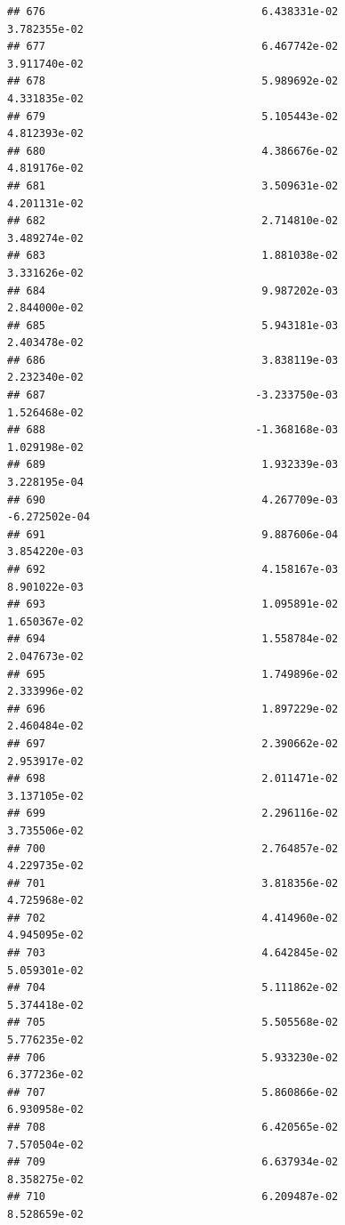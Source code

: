 \documentclass[
]{article}
\begin{document}
\begin{verbatim}
## 676                                  6.438331e-02           3.782355e-02
## 677                                  6.467742e-02           3.911740e-02
## 678                                  5.989692e-02           4.331835e-02
## 679                                  5.105443e-02           4.812393e-02
## 680                                  4.386676e-02           4.819176e-02
## 681                                  3.509631e-02           4.201131e-02
## 682                                  2.714810e-02           3.489274e-02
## 683                                  1.881038e-02           3.331626e-02
## 684                                  9.987202e-03           2.844000e-02
## 685                                  5.943181e-03           2.403478e-02
## 686                                  3.838119e-03           2.232340e-02
## 687                                 -3.233750e-03           1.526468e-02
## 688                                 -1.368168e-03           1.029198e-02
## 689                                  1.932339e-03           3.228195e-04
## 690                                  4.267709e-03          -6.272502e-04
## 691                                  9.887606e-04           3.854220e-03
## 692                                  4.158167e-03           8.901022e-03
## 693                                  1.095891e-02           1.650367e-02
## 694                                  1.558784e-02           2.047673e-02
## 695                                  1.749896e-02           2.333996e-02
## 696                                  1.897229e-02           2.460484e-02
## 697                                  2.390662e-02           2.953917e-02
## 698                                  2.011471e-02           3.137105e-02
## 699                                  2.296116e-02           3.735506e-02
## 700                                  2.764857e-02           4.229735e-02
## 701                                  3.818356e-02           4.725968e-02
## 702                                  4.414960e-02           4.945095e-02
## 703                                  4.642845e-02           5.059301e-02
## 704                                  5.111862e-02           5.374418e-02
## 705                                  5.505568e-02           5.776235e-02
## 706                                  5.933230e-02           6.377236e-02
## 707                                  5.860866e-02           6.930958e-02
## 708                                  6.420565e-02           7.570504e-02
## 709                                  6.637934e-02           8.358275e-02
## 710                                  6.209487e-02           8.528659e-02

\end{verbatim}
\end{document}
